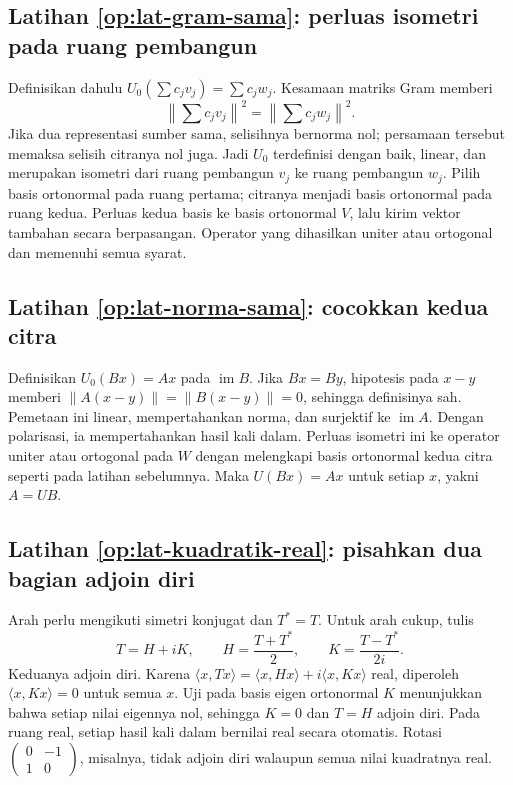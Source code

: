 \subsection*{Latihan \ref{op:lat-gram-sama}: perluas isometri pada ruang pembangun}
Definisikan dahulu $U_0(\sum c_jv_j)=\sum c_jw_j$.
Kesamaan matriks Gram memberi
\[
    \left\|\sum c_jv_j\right\|^2
      =\left\|\sum c_jw_j\right\|^2.
\]
Jika dua representasi sumber sama, selisihnya bernorma nol;
persamaan tersebut memaksa selisih citranya nol juga.
Jadi $U_0$ terdefinisi dengan baik, linear, dan merupakan
isometri dari ruang pembangun $v_j$ ke ruang pembangun $w_j$.
Pilih basis ortonormal pada ruang pertama; citranya menjadi
basis ortonormal pada ruang kedua. Perluas kedua basis ke
basis ortonormal $V$, lalu kirim vektor tambahan secara berpasangan.
Operator yang dihasilkan uniter atau ortogonal dan memenuhi semua syarat.

\subsection*{Latihan \ref{op:lat-norma-sama}: cocokkan kedua citra}
Definisikan $U_0(Bx)=Ax$ pada $\operatorname{im}B$.
Jika $Bx=By$, hipotesis pada $x-y$ memberi
$\|A(x-y)\|=\|B(x-y)\|=0$, sehingga definisinya sah.
Pemetaan ini linear, mempertahankan norma, dan surjektif ke
$\operatorname{im}A$. Dengan polarisasi, ia mempertahankan
hasil kali dalam. Perluas isometri ini ke operator uniter
atau ortogonal pada $W$ dengan melengkapi basis ortonormal
kedua citra seperti pada latihan sebelumnya. Maka $U(Bx)=Ax$
untuk setiap $x$, yakni $A=UB$.

\subsection*{Latihan \ref{op:lat-kuadratik-real}: pisahkan dua bagian adjoin diri}
Arah perlu mengikuti simetri konjugat dan $T^*=T$.
Untuk arah cukup, tulis
\[
    T=H+iK,\qquad H=\frac{T+T^*}{2},\qquad
    K=\frac{T-T^*}{2i}.
\]
Keduanya adjoin diri. Karena
$\langle x,Tx\rangle=\langle x,Hx\rangle+i\langle x,Kx\rangle$
real, diperoleh $\langle x,Kx\rangle=0$ untuk semua $x$.
Uji pada basis eigen ortonormal $K$ menunjukkan bahwa setiap
nilai eigennya nol, sehingga $K=0$ dan $T=H$ adjoin diri.
Pada ruang real, setiap hasil kali dalam bernilai real secara
otomatis. Rotasi $\begin{pmatrix}0&-1\\1&0\end{pmatrix}$,
misalnya, tidak adjoin diri walaupun semua nilai kuadratnya real.

